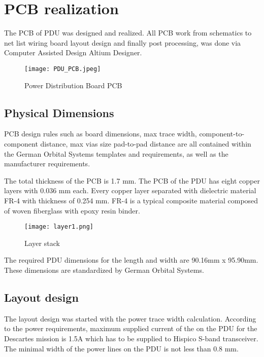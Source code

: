 \chapter{PCB realization\label{cha:chapter5}}

The PCB of PDU was designed and realized. All PCB work from schematics to net list wiring board layout design and finally post processing, was done via Computer Assisted Design Altium Designer. 

\begin{figure}[h]
	\centering
	\texttt{[image: PDU\_PCB.jpeg]}
	\caption{Power Distribution Board PCB}
	\label{fig: PCB_PDU}
\end{figure} 

\section{Physical Dimensions}

PCB design rules such as board dimensions, max trace width, component-to-component distance, max vias size pad-to-pad distance are all contained within the German Orbital Systems templates and requirements, as well as the manufacturer requirements. 

The total thickness of the PCB is 1.7 mm. The PCB of the PDU has eight copper layers with 0.036 mm each. Every copper layer separated with dielectric material FR-4 with thickness of 0.254 mm. FR-4 is a typical composite material composed of woven fiberglass with epoxy resin binder. 


\begin{figure}[h]
	\centering
	\texttt{[image: layer1.png]}
	\caption{Layer stack}
	\label{fig: layerstack}
\end{figure} 


The required PDU dimensions for the length and width are 90.16mm x 95.90mm. These dimensions are standardized by German Orbital Systems.

\section{Layout design}

The layout design was started with the power trace width calculation.
According to the power requirements, maximum supplied current of the on the PDU for the Descartes mission is 1.5A which has to be supplied to Hispico S-band transceiver. The minimal width of the power lines on the PDU is not less than 0.8 mm.

